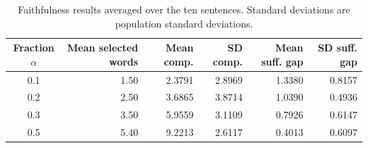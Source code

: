\begin{table}[htbp]
\centering
\caption{Faithfulness results averaged over the ten sentences. Standard deviations are population standard deviations.}
\label{tab:faithfulness-aggregate}
\small
\begin{tabular}{crrrrr}
\toprule
Fraction $\alpha$ & Mean selected words & Mean comp. & SD comp. & Mean suff. gap & SD suff. gap \\
\midrule
0.1 & 1.50 & 2.3791 & 2.8969 & 1.3380 & 0.8157 \\
0.2 & 2.50 & 3.6865 & 3.8714 & 1.0390 & 0.4936 \\
0.3 & 3.50 & 5.9559 & 3.1109 & 0.7926 & 0.6147 \\
0.5 & 5.40 & 9.2213 & 2.6117 & 0.4013 & 0.6097 \\
\bottomrule
\end{tabular}
\end{table}
